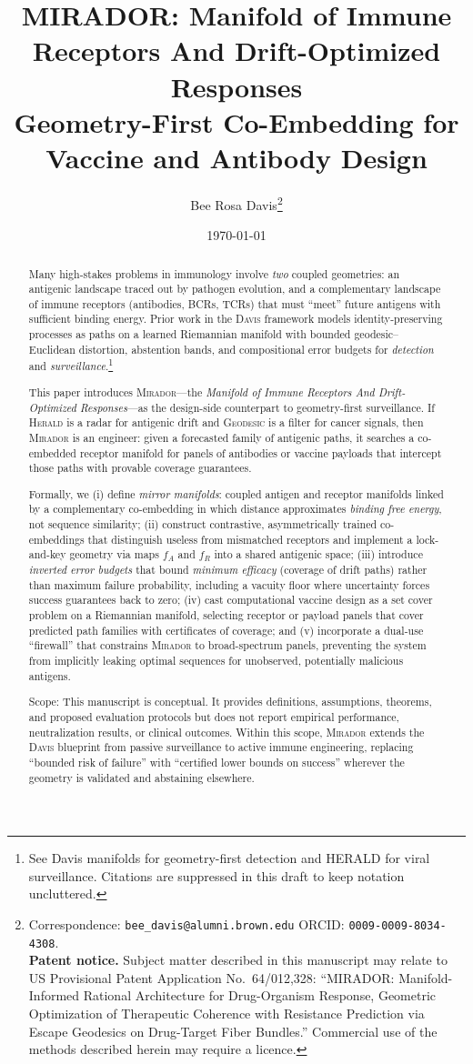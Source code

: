 \documentclass[11pt]{article}
\title{MIRADOR: Manifold of Immune Receptors And Drift-Optimized Responses\\[4pt]
Geometry-First Co-Embedding for Vaccine and Antibody Design}
\author{Bee Rosa Davis\thanks{%
  Correspondence: \texttt{bee\_davis@alumni.brown.edu}\quad
  ORCID: \texttt{0009-0009-8034-4308}.\\[2pt]
  \textbf{Patent notice.}
  Subject matter described in this manuscript may relate to
  US Provisional Patent Application No.\ 64/012,328:
  ``MIRADOR: Manifold-Informed Rational Architecture for Drug-Organism Response,
  Geometric Optimization of Therapeutic Coherence with Resistance Prediction via
  Escape Geodesics on Drug-Target Fiber Bundles.''
  Commercial use of the methods described herein may require a licence.
}}
\date{\today}
\newcommand{\mirador}{\textsc{Mirador}}
\newcommand{\herald}{\textsc{Herald}}
\newcommand{\geodesic}{\textsc{Geodesic}}
\newcommand{\davis}{\textsc{Davis}}
\begin{document}
\maketitle

\begin{abstract}
Many high-stakes problems in immunology involve \emph{two} coupled geometries: an antigenic
landscape traced out by pathogen evolution, and a complementary landscape of immune receptors
(antibodies, BCRs, TCRs) that must ``meet'' future antigens with sufficient binding energy.
Prior work in the \davis{} framework models identity-preserving processes as paths on a learned
Riemannian manifold with bounded geodesic--Euclidean distortion, abstention bands, and
compositional error budgets for \emph{detection} and \emph{surveillance}.\footnote{See
Davis manifolds for geometry-first detection and HERALD for viral surveillance. Citations are
suppressed in this draft to keep notation uncluttered.}

This paper introduces \mirador{}---the \emph{Manifold of Immune Receptors And
Drift-Optimized Responses}---as the design-side counterpart to geometry-first surveillance.
If \herald{} is a radar for antigenic drift and \geodesic{} is a filter for cancer signals, then
\mirador{} is an engineer: given a forecasted family of antigenic paths, it searches a
co-embedded receptor manifold for panels of antibodies or vaccine payloads that intercept
those paths with provable coverage guarantees.

Formally, we (i) define \emph{mirror manifolds}: coupled antigen and receptor manifolds
linked by a complementary co-embedding in which distance approximates \emph{binding free
energy}, not sequence similarity; (ii) construct contrastive, asymmetrically trained
co-embeddings that distinguish useless from mismatched receptors and implement a
lock-and-key geometry via maps $f_A$ and $f_R$ into a shared antigenic space; (iii) introduce
\emph{inverted error budgets} that bound \emph{minimum efficacy} (coverage of drift paths)
rather than maximum failure probability, including a vacuity floor where uncertainty forces
success guarantees back to zero; (iv) cast computational vaccine design as a set cover
problem on a Riemannian manifold, selecting receptor or payload panels that cover predicted
path families with certificates of coverage; and (v) incorporate a dual-use ``firewall''
that constrains \mirador{} to broad-spectrum panels, preventing the system from implicitly
leaking optimal sequences for unobserved, potentially malicious antigens.

Scope: This manuscript is conceptual. It provides definitions, assumptions, theorems, and
proposed evaluation protocols but does not report empirical performance, neutralization
results, or clinical outcomes. Within this scope, \mirador{} extends the \davis{}
blueprint from passive surveillance to active immune engineering, replacing ``bounded risk
of failure'' with ``certified lower bounds on success'' wherever the geometry is validated
and abstaining elsewhere.
\end{abstract}
\clearpage
\end{document}
